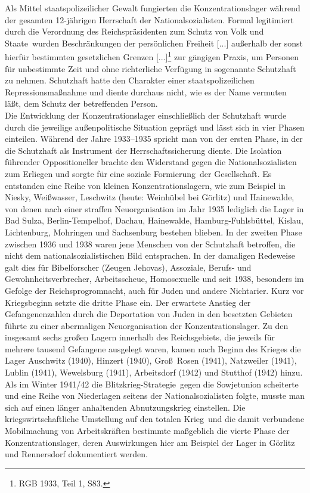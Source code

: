 \documentclass[a4paper,12pt,ngerman,
]{nisebook}
\begin{document}
Als Mittel staatspolizeilicher Gewalt fungierten die Konzentrationslager während der gesamten 12-jährigen Herrschaft der Nationalsozialisten. Formal legitimiert durch die \glqq Verordnung des Reichspräsidenten zum Schutz von Volk und Staate\grqq~wurden \glqq Beschränkungen der persönlichen Freiheit [...] außerhalb der sonst hierfür bestimmten gesetzlichen Grenzen [...]\grqq\footnote{RGB 1933, Teil 1, S83.} zur gängigen Praxis, um Personen für unbestimmte Zeit und ohne richterliche Verfügung in sogenannte Schutzhaft zu nehmen. Schutzhaft hatte den Charakter einer staatspolizeilichen Repressionsmaßnahme und diente durchaus nicht, wie es der Name vermuten läßt, dem Schutz der betreffenden Person.
\\
Die Entwicklung der Konzentrationslager einschließlich der Schutzhaft wurde durch die jeweilige außenpolitische Situation geprägt und lässt sich in vier Phasen einteilen. Während der Jahre 1933--1935 spricht man von der ersten Phase, in der die Schutzhaft als Instrument der Herrschaftssicherung diente. Die Isolation führender Oppositioneller brachte den Widerstand gegen die Nationalsozialisten zum Erliegen und sorgte für eine \glqq soziale Formierung\grqq~der Gesellschaft. Es entstanden eine Reihe von kleinen Konzentrationslagern, wie zum Beispiel in Niesky, Weißwasser, Leschwitz (heute: Weinhübel bei Görlitz) und Hainewalde, von denen nach einer straffen Neuorganisation im Jahr 1935 lediglich die Lager in Bad Sulza, Berlin-Tempelhof, Dachau, Hainewalde, Hamburg-Fuhlsbüttel, Kislau, Lichtenburg, Mohringen und Sachsenburg bestehen blieben.
In der zweiten Phase zwischen 1936 und 1938 waren jene Menschen von der Schutzhaft betroffen, die nicht dem nationalsozialistischen Bild entsprachen. In der damaligen Redeweise galt dies für Bibelforscher (Zeugen Jehovas), Assoziale, Berufs- und Gewohnheitsverbrecher, Arbeitsscheue, Homosexuelle und seit 1938, besonders im Gefolge der Reichsprogromnacht, auch für Juden und andere \glqq Nichtarier\grqq.
Kurz vor Kriegsbeginn setzte die dritte Phase ein. Der erwartete Anstieg der Gefangenenzahlen durch die Deportation von Juden in den besetzten Gebieten führte zu einer abermaligen Neuorganisation der Konzentrationslager. Zu den insgesamt sechs großen Lagern innerhalb des Reichsgebiets, die jeweils für mehrere tausend Gefangene ausgelegt waren, kamen nach Beginn des Krieges die Lager Auschwitz (1940), Hinzert (1940), Groß~Rosen (1941), Natzweiler (1941), Lublin (1941), Wewelsburg (1941), Arbeitsdorf (1942) und Stutthof (1942) hinzu. 
\\
Als im Winter 1941/42 die \glqq Blitzkrieg-Strategie\grqq~gegen die Sowjetunion scheiterte und eine Reihe von Niederlagen seitens der Nationalsozialisten folgte, musste man sich auf einen länger anhaltenden Abnutzungskrieg einstellen. Die kriegswirtschaftliche Umstellung auf den \glqq totalen Krieg\grqq~und die damit verbundene Mobilmachung von Arbeitskräften bestimmte maßgeblich die vierte Phase der Konzentrationslager, deren Auswirkungen hier am Beispiel der Lager in Görlitz und Rennersdorf dokumentiert werden. 
\end{document}

